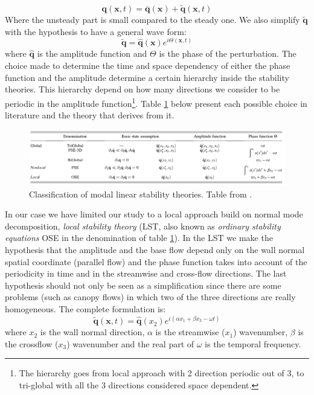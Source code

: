 $$ \mathbf{q} (\mathbf{x},t)= \overline{\mathbf{q}} (\mathbf{x}) + \widetilde{\mathbf{q}} (\mathbf{x},t) $$
Where the unsteady part is small compared to the steady one. We also simplify $\widetilde{\mathbf{q}}$ with the hypothesis to have a general wave form:
$$  \widetilde{\mathbf{q}} =  \widehat{\mathbf{q}}(\mathbf{x}) e^{i\Theta(\mathbf{x},t)} $$
where $\widehat{\mathbf{q}}$ is the amplitude function and $\Theta$ is the phase of the perturbation.
The choice made to determine the time and space dependency of either the phase function and the amplitude determine a certain hierarchy inside the stability theories. This hierarchy depend on how many directions we consider to be periodic in the amplitude function\footnote{The hierarchy goes from local approach with 2 direction periodic out of 3, to tri-global with all the 3 directions considered space dependent.}.
Table \ref{fig:table} below present each possible choice in literature and the theory that derives from it.

\begin{figure}[h]
	\centering
	\includegraphics[width=1\linewidth]{chapter_1/table}
	\caption{Classification of modal linear stability theories. Table from \citet{juniper2014modal}.}
	\label{fig:table}
\end{figure}
 
In our case we have limited our study to a local approach build on normal mode decomposition, \textit{local stability theory} (LST, also known as \textit{ordinary stability equations} OSE in the denomination of table \ref{fig:table}).
In the LST we make the hypothesis that the amplitude and the base flow depend only on the wall normal spatial coordinate (parallel flow) and the phase function takes into account of the periodicity in time and in the streamwise and cross-flow directions.
The last hypothesis should not only be seen as a simplification since there are some problems (such as canopy flows) in which two of the three directions are really homogeneous.
The complete formulation is:
 $$  \widetilde{\mathbf{q}}(\mathbf{x},t) =  \widehat{\mathbf{q}}(x_2) e^{i(\alpha x_1 + \beta x_3 - \omega t)}  $$ 
where $x_2$ is the wall normal direction, $\alpha$ is the streamwise ($x_1$) wavenumber, $\beta$ is the crossflow ($x_3$) wavenumber and the real part of $\omega$ is the temporal frequency.

